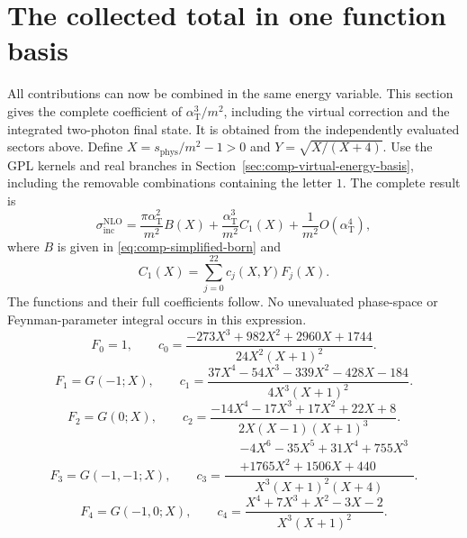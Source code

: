 \section{The collected total in one function basis}
\label{sec:comp-total-energy-collected}
All contributions can now be combined in the same energy variable. This section gives the complete coefficient of $\alpha_{\mathrm T}^3/m^2$, including the virtual correction and the integrated two-photon final state. It is obtained from the independently evaluated sectors above. Define $X=s_{\mathrm{phys}}/m^2-1>0$ and $Y=\sqrt{X/(X+4)}$. Use the GPL kernels and real branches in Section~\ref{sec:comp-virtual-energy-basis}, including the removable combinations containing the letter $1$. The complete result is
\begin{equation}
\sigma_{\mathrm{inc}}^{\mathrm{NLO}}=\frac{\pi\alpha_{\mathrm T}^2}{m^2}B(X)+\frac{\alpha_{\mathrm T}^3}{m^2}C_1(X)+\frac1{m^2}O(\alpha_{\mathrm T}^4),
\end{equation}
where $B$ is given in \eqref{eq:comp-simplified-born} and
\begin{equation}\boxed{C_1(X)=\sum_{j=0}^{22}c_j(X,Y)F_j(X).}\label{eq:comp-total-energy-collected}\end{equation}
The functions and their full coefficients follow. No unevaluated phase-space or Feynman-parameter integral occurs in this expression.
\begin{equation}
 F_{0}=1,\qquad c_{0}=\frac{- 273 X^{3} + 982 X^{2} + 2960 X + 1744}{24 X^{2} \left(X + 1\right)^{2}}.
\end{equation}
\begin{equation}
 F_{1}=G(-1;X),\qquad c_{1}=\frac{37 X^{4} - 54 X^{3} - 339 X^{2} - 428 X - 184}{4 X^{3} \left(X + 1\right)^{2}}.
\end{equation}
\begin{equation}
 F_{2}=G(0;X),\qquad c_{2}=\frac{- 14 X^{4} - 17 X^{3} + 17 X^{2} + 22 X + 8}{2 X \left(X - 1\right) \left(X + 1\right)^{3}}.
\end{equation}
\begin{equation}
 F_{3}=G(-1,-1;X),\qquad c_{3}=\frac{\begin{aligned}&- 4 X^{6} - 35 X^{5} + 31 X^{4} + 755 X^{3}\\&+1765 X^{2} + 1506 X + 440\end{aligned}}{X^{3} \left(X + 1\right)^{2} \left(X + 4\right)}.
\end{equation}
\begin{equation}
 F_{4}=G(-1,0;X),\qquad c_{4}=\frac{X^{4} + 7 X^{3} + X^{2} - 3 X - 2}{X^{3} \left(X + 1\right)^{2}}.
\end{equation}
